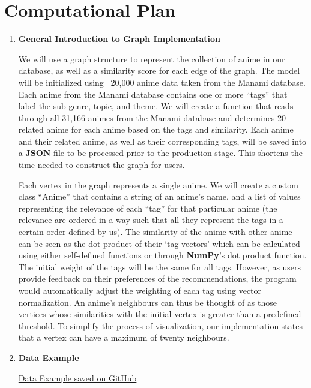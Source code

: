 \documentclass[fontsize=11pt]{article}
\begin{document}
\section*{Computational Plan}

\begin{enumerate}
    \item \textbf{General Introduction to Graph Implementation}
    
    \quad We will use a graph structure to represent the collection of anime in our database, as well as a similarity score for each edge of the graph. The model will be initialized using ~20,000 anime data taken from the Manami database. Each anime from the Manami database contains one or more “tags” that label the sub-genre, topic, and theme. We will create a function that reads through all 31,166 animes from the Manami database and determines 20 related anime for each anime based on the tags and similarity. Each anime and their related anime, as well as their corresponding tags, will be saved into a \textbf{JSON} file to be processed prior to the production stage. This shortens the time needed to construct the graph for users.
    
    \quad Each vertex in the graph represents a single anime. We will create a custom class “Anime” that contains a string of an anime’s name, and a list of values representing the relevance of each “tag” for that particular anime (the relevance are ordered in a way such that all they represent the tags in a certain order defined by us). The similarity of the anime with other anime can be seen as the dot product of their ‘tag vectors’ which can be calculated using either self-defined functions or through \textbf{\textbf{NumPy}}’s dot product function. The initial weight of the tags will be the same for all tags. However, as users provide feedback on their preferences of the recommendations, the program would automatically adjust the weighting of each tag using vector normalization. An anime’s neighbours can thus be thought of as those vertices whose similarities with the initial vertex is greater than a predefined threshold. To simplify the process of visualization, our implementation states that a vertex can have a maximum of twenty neighbours.
    
    \item \textbf{Data Example}
    
    \href{https://gist.github.com/RealFakeAccount/cf34244d17039e78512428a1cf51d95f}{Data Example saved on GitHub} \citep{manami}
    

\end{enumerate}
\end{document}
